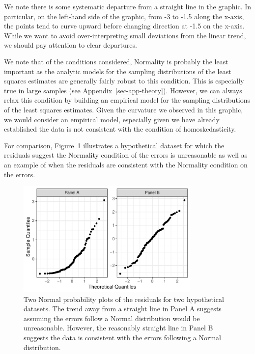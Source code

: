 \documentclass[
  letterpaper,
  DIV=11,
  numbers=noendperiod]{scrreprt}
\theoremstyle{definition}
\theoremstyle{definition}
\theoremstyle{plain}
\theoremstyle{remark}
\begin{document}
We note there is some systematic departure from a straight line in the
graphic. In particular, on the left-hand side of the graphic, from -3 to
-1.5 along the x-axis, the points tend to curve upward before changing
direction at -1.5 on the x-axis. While we want to avoid
over-interpreting small deviations from the linear trend, we should pay
attention to clear departures.

We note that of the conditions considered, Normality is probably the
least important as the analytic models for the sampling distributions of
the least squares estimates are generally fairly robust to this
condition. This is especially true in large samples (see
Appendix~\ref{sec-app-theory}). However, we can always relax this
condition by building an empirical model for the sampling distributions
of the least squares estimates. Given the curvature we observed in this
graphic, we would consider an empirical model, especially given we have
already established the data is not consistent with the condition of
homoskedasticity.

For comparison, Figure~\ref{fig-regassessment-normal-comparison}
illustrates a hypothetical dataset for which the residuals suggest the
Normality condition of the errors is unreasonable as well as an example
of when the residuals are consistent with the Normality condition on the
errors.

\begin{figure}

{\centering \includegraphics[width=0.8\textwidth,height=\textheight]{./images/fig-regassessment-normal-comparison-1.pdf}

}

\caption{\label{fig-regassessment-normal-comparison}Two Normal
probability plots of the residuals for two hypothetical datasets. The
trend away from a straight line in Panel A suggests assuming the errors
follow a Normal distribution would be unreasonable. However, the
reasonably straight line in Panel B suggests the data is consistent with
the errors following a Normal distribution.}

\end{figure}
\end{document}

